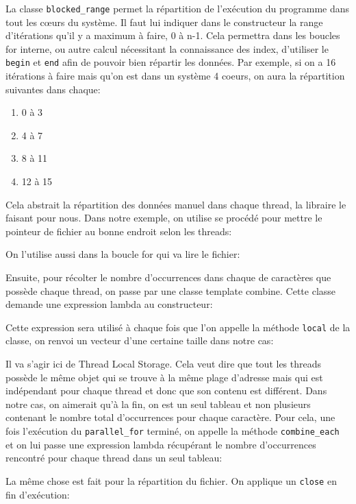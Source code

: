 \documentclass[10pt,a4paper]{article}
\begin{document}
La classe \texttt{blocked\_range} permet la répartition de l'exécution du programme dans tout les cœurs du système. Il faut lui indiquer dans le constructeur la range d'itérations qu'il y a maximum à faire, 0 à n-1. Cela permettra dans les boucles for interne, ou autre calcul nécessitant la connaissance des index, d'utiliser le \texttt{begin} et \texttt{end} afin de pouvoir bien répartir les données. Par exemple, si on a 16 itérations à faire mais qu'on est dans un système 4 coeurs, on aura la répartition suivantes dans chaque:
\begin{enumerate}
	\item 0 à 3
	\item 4 à 7
	\item 8 à 11
	\item 12 à 15
\end{enumerate}
Cela abstrait la répartition des données manuel dans chaque thread, la libraire le faisant pour nous. Dans notre exemple, on utilise se procédé pour mettre le pointeur de fichier au bonne endroit selon les threads:

On l'utilise aussi dans la boucle for qui va lire le fichier:


Ensuite, pour récolter le nombre d'occurrences dans chaque de caractères que possède chaque thread, on passe par une classe template combine. Cette classe demande une expression lambda au constructeur:

Cette expression sera utilisé à chaque fois que l'on appelle la méthode \texttt{local} de la classe, on renvoi un vecteur d'une certaine taille dans notre cas:

Il va s'agir ici de Thread Local Storage. Cela veut dire que tout les threads possède le même objet qui se trouve à la même plage d'adresse mais qui est indépendant pour chaque thread et donc que son contenu est différent. Dans notre cas, on aimerait qu'à la fin, on est un seul tableau et non plusieurs contenant le nombre total d’occurrences pour chaque caractère. Pour cela, une fois l'exécution du \texttt{parallel\_for} terminé, on appelle la méthode \texttt{combine\_each} et on lui passe  une expression lambda récupérant le nombre d'occurrences rencontré pour chaque thread dans un seul tableau:

La même chose est fait pour la répartition du fichier. On applique un \texttt{close} en fin d'exécution:

\end{document}
